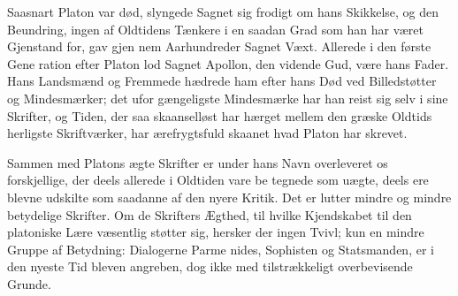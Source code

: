 \documentclass[12pt,a4paper]{book}
\newcommand{\gk}[1]{\textit{#1}}
\begin{document}
Saasnart Platon var død, slyngede Sagnet sig frodigt om
hans Skikkelse, og den Beundring, ingen af Oldtidens Tænkere
\setcounter{footnote}{0}
i en saadan Grad som han har været Gjenstand for, gav gjen\-%
nem Aarhundreder Sagnet Væxt. Allerede i den første Gene\-%
ration efter Platon lod Sagnet Apollon, den vidende Gud, være
hans Fader. Hans Landsmænd og Fremmede hædrede ham
efter hans Død ved Billedstøtter og Mindesmærker; det ufor\-%
gængeligste Mindesmærke har han reist sig selv i sine Skrifter,
og Tiden, der saa skaanselløst har hærget mellem den græske
Oldtids herligste Skriftværker, har ærefrygtsfuld skaanet hvad
Platon har skrevet.

Sammen med Platons ægte Skrifter er under hans Navn
overleveret os forskjellige, der deels allerede i Oldtiden vare be\-%
tegnede som uægte, deels ere blevne udskilte som saadanne af
den nyere Kritik. Det er lutter mindre og mindre betydelige
Skrifter. Om de Skrifters Ægthed, til hvilke Kjendskabet til
den platoniske Lære væsentlig støtter sig, hersker der ingen
Tvivl; kun en mindre Gruppe af Betydning: Dialogerne Parme\-%
nides, Sophisten og Statsmanden, er i den nyeste Tid bleven
angreben, dog ikke med tilstrækkeligt overbevisende Grunde.
\end{document}
